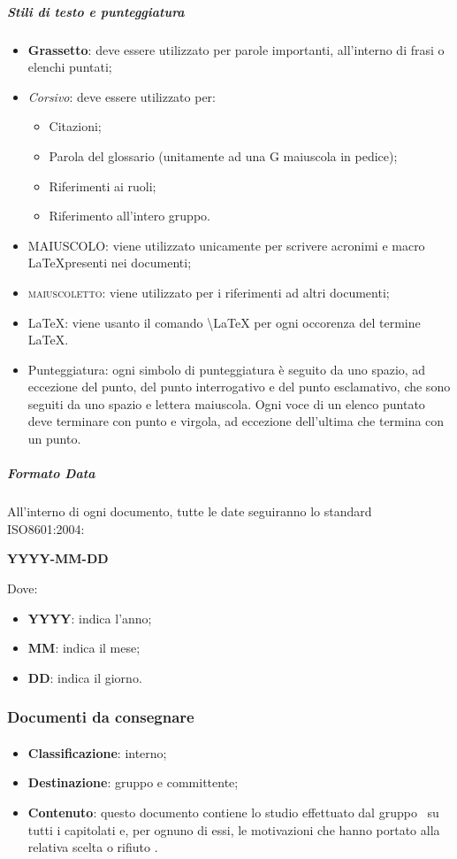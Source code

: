 				\subparagraph{Stili di testo e punteggiatura}
				\begin{itemize}
					\item \textbf{Grassetto}: deve essere utilizzato per parole importanti, all’interno di frasi o elenchi puntati;
					\item \textit{Corsivo}: deve essere utilizzato per:
					\begin{itemize}
						\item Citazioni;
						\item Parola del glossario (unitamente ad una G maiuscola in pedice);
						\item Riferimenti ai ruoli;
						\item Riferimento all’intero gruppo.
					\end{itemize}
					\item MAIUSCOLO: viene utilizzato unicamente per scrivere acronimi e macro \LaTeX presenti nei documenti;
					\item \textsc{maiuscoletto}: viene utilizzato per i riferimenti ad altri documenti;
					\item \LaTeX: viene usanto il comando \textbackslash{LaTeX} per ogni occorenza del termine \LaTeX.
					\item Punteggiatura: ogni simbolo di punteggiatura è seguito da uno spazio, ad eccezione del punto, del punto interrogativo e del punto esclamativo, che sono seguiti da uno spazio e lettera maiuscola. Ogni voce di un elenco puntato deve terminare con punto e virgola, ad eccezione dell’ultima che termina con un punto. 
					\end{itemize}
	
				\subparagraph{Formato Data}
				All’interno di ogni documento, tutte le date seguiranno lo standard ISO\ped{G}8601:2004:
				\begin{center}
					\textbf{YYYY-MM-DD}
				\end{center}
				Dove:
				\begin{itemize}
					\item \textbf{YYYY}: indica l’anno;
					\item \textbf{MM}: indica il mese;
					\item \textbf{DD}: indica il giorno.
				\end{itemize}
		
		\subsubsection{Documenti da consegnare}
			\paragraph{\SdF}
			\begin{itemize}
				\item \textbf{Classificazione}: interno;
				\item \textbf{Destinazione}: gruppo e committente;
				\item \textbf{Contenuto}: questo documento contiene lo studio effettuato dal gruppo \gruppo\ su tutti i capitolati e, per ognuno di essi, le motivazioni che hanno portato alla relativa scelta o rifiuto .
			\end{itemize}

